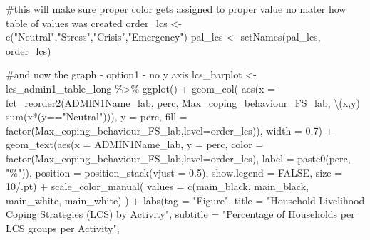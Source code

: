 \documentclass[
  letterpaper,
  DIV=11,
  numbers=noendperiod]{scrreprt}
\newenvironment{Shaded}{\begin{snugshade}}{\end{snugshade}}
\newcommand{\AttributeTok}[1]{\textcolor[rgb]{0.40,0.45,0.13}{#1}}
\newcommand{\CommentTok}[1]{\textcolor[rgb]{0.37,0.37,0.37}{#1}}
\newcommand{\ConstantTok}[1]{\textcolor[rgb]{0.56,0.35,0.01}{#1}}
\newcommand{\DecValTok}[1]{\textcolor[rgb]{0.68,0.00,0.00}{#1}}
\newcommand{\FloatTok}[1]{\textcolor[rgb]{0.68,0.00,0.00}{#1}}
\newcommand{\FunctionTok}[1]{\textcolor[rgb]{0.28,0.35,0.67}{#1}}
\newcommand{\NormalTok}[1]{\textcolor[rgb]{0.00,0.23,0.31}{#1}}
\newcommand{\OtherTok}[1]{\textcolor[rgb]{0.00,0.23,0.31}{#1}}
\newcommand{\SpecialCharTok}[1]{\textcolor[rgb]{0.37,0.37,0.37}{#1}}
\newcommand{\StringTok}[1]{\textcolor[rgb]{0.13,0.47,0.30}{#1}}
\begin{document}
\begin{Shaded}
\begin{Highlighting}[]
\CommentTok{\#this will make sure proper color gets assigned to proper value no mater how table of values was created}
\NormalTok{order\_lcs }\OtherTok{\textless{}{-}} \FunctionTok{c}\NormalTok{(}\StringTok{"Neutral"}\NormalTok{,}\StringTok{"Stress"}\NormalTok{,}\StringTok{"Crisis"}\NormalTok{,}\StringTok{"Emergency"}\NormalTok{)}
\NormalTok{pal\_lcs }\OtherTok{\textless{}{-}} \FunctionTok{setNames}\NormalTok{(pal\_lcs, order\_lcs)}

\CommentTok{\#and now the graph {-} option1 {-} no y axis }
\NormalTok{lcs\_barplot }\OtherTok{\textless{}{-}}\NormalTok{ lcs\_admin1\_table\_long }\SpecialCharTok{\%\textgreater{}\%} 
  \FunctionTok{ggplot}\NormalTok{() }\SpecialCharTok{+}
  \FunctionTok{geom\_col}\NormalTok{(}
    \FunctionTok{aes}\NormalTok{(}\AttributeTok{x =} \FunctionTok{fct\_reorder2}\NormalTok{(ADMIN1Name\_lab,}
\NormalTok{                         perc,  }
\NormalTok{                         Max\_coping\_behaviour\_FS\_lab,}
\NormalTok{                         \textbackslash{}(x,y) }\FunctionTok{sum}\NormalTok{(x}\SpecialCharTok{*}\NormalTok{(y}\SpecialCharTok{==}\StringTok{"Neutral"}\NormalTok{))), }
        \AttributeTok{y =}\NormalTok{ perc,}
        \AttributeTok{fill =} \FunctionTok{factor}\NormalTok{(Max\_coping\_behaviour\_FS\_lab,}\AttributeTok{level=}\NormalTok{order\_lcs)), }
    \AttributeTok{width =} \FloatTok{0.7}\NormalTok{) }\SpecialCharTok{+}
  \FunctionTok{geom\_text}\NormalTok{(}\FunctionTok{aes}\NormalTok{(}\AttributeTok{x =}\NormalTok{ ADMIN1Name\_lab,}
                \AttributeTok{y =}\NormalTok{ perc,}
                \AttributeTok{color =} \FunctionTok{factor}\NormalTok{(Max\_coping\_behaviour\_FS\_lab,}\AttributeTok{level=}\NormalTok{order\_lcs),}
                \AttributeTok{label =} \FunctionTok{paste0}\NormalTok{(perc, }\StringTok{"\%"}\NormalTok{)),}
            \AttributeTok{position =} \FunctionTok{position\_stack}\NormalTok{(}\AttributeTok{vjust =} \FloatTok{0.5}\NormalTok{),}
            \AttributeTok{show.legend =} \ConstantTok{FALSE}\NormalTok{,}
            \AttributeTok{size =} \DecValTok{10}\SpecialCharTok{/}\NormalTok{.pt) }\SpecialCharTok{+}
  \FunctionTok{scale\_color\_manual}\NormalTok{(}
    \AttributeTok{values =} \FunctionTok{c}\NormalTok{(main\_black, main\_black, main\_white, main\_white)}
\NormalTok{  ) }\SpecialCharTok{+}
  \FunctionTok{labs}\NormalTok{(}\AttributeTok{tag =} \StringTok{"Figure"}\NormalTok{,}
       \AttributeTok{title =} \StringTok{"Household Livelihood Coping Strategies (LCS) by Activity"}\NormalTok{,}
       \AttributeTok{subtitle =} \StringTok{"Percentage of Households per LCS groups per Activity"}\NormalTok{,}

\end{Highlighting}
\end{Shaded}
\end{document}
